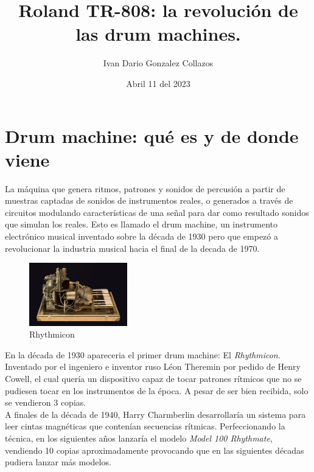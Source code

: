 \documentclass{article}
\title{Roland TR-808: la revolución de las drum machines.}
\author{Ivan Dario Gonzalez Collazos}
\date{Abril 11 del 2023}
\begin{document}
\maketitle

\section{Drum machine: qué es y de donde viene}

La máquina que genera ritmos, patrones y sonidos de percusión a partir de muestras captadas de sonidos de instrumentos reales, o generados a través de circuitos modulando características de una señal para dar como resultado sonidos que simulan los reales\cite{wikidrum}. Esto es llamado el drum machine, un instrumento electrónico musical inventado sobre la década de 1930 pero que empezó a revolucionar la industria musical hacia el final de la decada de 1970.\\

\begingroup
\setlength{\intextsep}{0pt}%
\setlength{\columnsep}{0pt}%

\begin{figure}
    \centering
    \includegraphics[width=0.38\textwidth]{images/rhythmicon.jpg}
    \vspace{-5pt}
    \caption{Rhythmicon}
\end{figure}

En la década de 1930 apareceria el primer drum machine: El \emph{Rhythmicon}. Inventado por el ingeniero e inventor ruso Léon Theremin por pedido de Henry Cowell, el cual quería un dispositivo capaz de tocar patrones rítmicos que no se pudiesen tocar en los instrumentos de la época. A pesar de ser bien recibida, solo se vendieron 3 copias.\cite{wikirhythmicon}\cite{drumbook}\\

A finales de la década de 1940, Harry Charmberlin desarrollaría un sistema para leer cintas magnéticas que contenían secuencias rítmicas. Perfeccionando la técnica, en los siguientes años lanzaría el modelo \emph{Model 100 Rhythmate}, vendiendo 10 copias aproximadamente provocando que en las siguientes décadas pudiera lanzar más modelos.\cite{14drums}\cite{drumbook}\\
\end{document}

